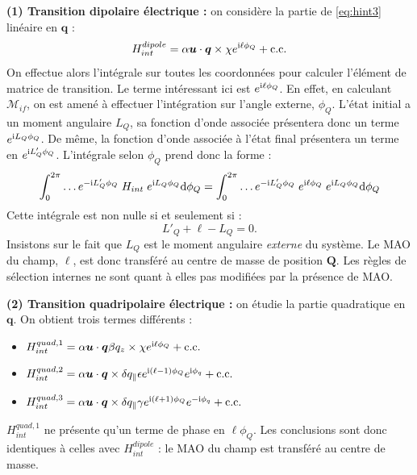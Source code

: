 \textbf{(1) Transition dipolaire électrique :} on considère la partie de \ref{eq:hint3} linéaire en $\bm{q}$ : 
\[H^{dipole}_{int} = \alpha\bm{u}\cdot\bm{q}\times\chi e^{\mathrm{i}\ell\phi_Q}+\text{c.c.}\]
On effectue alors l'intégrale sur toutes les coordonnées pour calculer l'élément de matrice de transition. Le terme intéressant ici est $e^{\mathrm{i}\ell\phi_Q}$. En effet, en calculant $\mathcal{M}_{if}$, on est amené à effectuer l'intégration sur l'angle externe, $\phi_Q$. L'état initial a un moment angulaire $L_Q$, sa fonction d'onde associée présentera donc un terme $e^{\mathrm{i} L_Q \phi_Q}$. De même, la fonction d'onde associée à l'état final présentera un terme en $e^{\mathrm{i} L'_Q \phi_Q}$. L'intégrale selon $\phi_Q$ prend donc la forme :
\begin{equation}
\int_{0}^{2\pi} \ldots e^{-\mathrm{i} L'_Q\phi_Q}\;H_{int}\;e^{\mathrm{i} L_Q\phi_Q} \mathrm{d}\phi_Q = \int_{0}^{2\pi} \ldots e^{-\mathrm{i} L'_Q\phi_Q}\;e^{\mathrm{i}\ell\phi_Q}\;e^{\mathrm{i} L_Q\phi_Q} \mathrm{d}\phi_Q
\end{equation}
Cette intégrale est non nulle si et seulement si :
\begin{equation}
L'_Q+\ell-L_Q=0.
\end{equation}
Insistons sur le fait que $L_Q$ est le moment angulaire \textit{externe} du système. Le MAO du champ, $\ell$, est donc transféré au centre de masse de position $\bm{Q}$. Les règles de sélection internes ne sont quant à elles pas modifiées par la présence de MAO.

\textbf{(2) Transition quadripolaire électrique :} on étudie la partie quadratique en $\bm{q}$. On obtient trois termes différents :

\begin{itemize}
\renewcommand{\labelitemi}{$\bullet$}
\setlength\itemsep{1em}
\item $H^{quad,1}_{int} = \alpha\bm{u}\cdot\bm{q}\beta q_z \times\chi e^{\mathrm{i}\ell\phi_Q}+\text{c.c.}$ 
\item $H^{quad,2}_{int} = \alpha\bm{u}\cdot\bm{q} \times \delta q_{\parallel}\epsilon e^{\mathrm{i}(\ell-1)\phi_Q}e^{\mathrm{i} \phi_q}+\text{c.c.}$
\item $H^{quad,3}_{int} = \alpha\bm{u}\cdot\bm{q} \times \delta q_{\parallel}\gamma e^{\mathrm{i}(\ell+1)\phi_Q}e^{-\mathrm{i} \phi_q}+\text{c.c.}$
\end{itemize}
\vspace{\baselineskip}

$H^{quad,1}_{int}$ ne présente qu'un terme de phase en $\ell\phi_Q$. Les conclusions sont donc identiques à celles avec $H^{dipole}_{int}$ : le MAO du champ est transféré au centre de masse.\par

